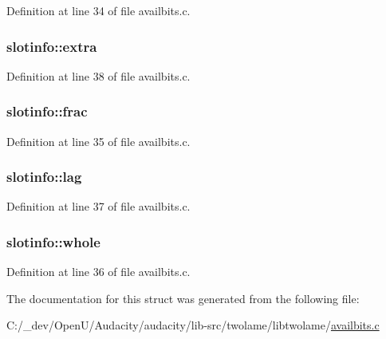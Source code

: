 Definition at line 34 of file availbits.\+c.

\subsubsection[{\texorpdfstring{extra}{extra}}]{ slotinfo\+::extra}\hypertarget{structslotinfo_acefe5063703e5da84378661b8caefd61}{}\label{structslotinfo_acefe5063703e5da84378661b8caefd61}


Definition at line 38 of file availbits.\+c.

\subsubsection[{\texorpdfstring{frac}{frac}}]{ slotinfo\+::frac}\hypertarget{structslotinfo_a1c794ac75eaea4262b6173cfbc23d9ac}{}\label{structslotinfo_a1c794ac75eaea4262b6173cfbc23d9ac}


Definition at line 35 of file availbits.\+c.

\subsubsection[{\texorpdfstring{lag}{lag}}]{ slotinfo\+::lag}\hypertarget{structslotinfo_a6aaf9bb99b2ae52c8b5f70cb266b2b9b}{}\label{structslotinfo_a6aaf9bb99b2ae52c8b5f70cb266b2b9b}


Definition at line 37 of file availbits.\+c.

\subsubsection[{\texorpdfstring{whole}{whole}}]{ slotinfo\+::whole}\hypertarget{structslotinfo_a14c0d93d7d67c9a13b12df28061462cb}{}\label{structslotinfo_a14c0d93d7d67c9a13b12df28061462cb}


Definition at line 36 of file availbits.\+c.



The documentation for this struct was generated from the following file\+:\begin{DoxyCompactItemize}
\item 
C\+:/\+\_\+dev/\+Open\+U/\+Audacity/audacity/lib-\/src/twolame/libtwolame/\hyperlink{availbits_8c}{availbits.\+c}\end{DoxyCompactItemize}
